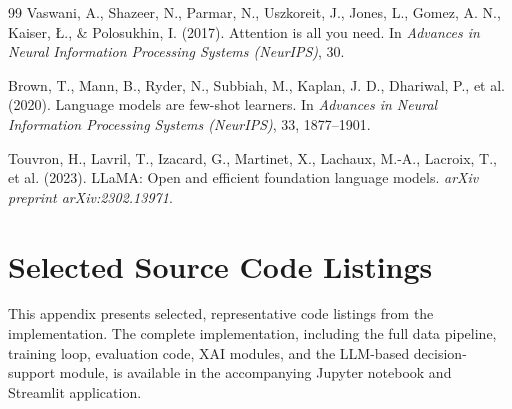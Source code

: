 \documentclass[12pt,a4paper,oneside]{report}
\begin{document}
\begin{thebibliography}{99}
Vaswani, A., Shazeer, N., Parmar, N., Uszkoreit, J., Jones, L., Gomez, A. N., Kaiser, {\L}., \& Polosukhin, I.
(2017). Attention is all you need. In \textit{Advances in Neural Information Processing Systems (NeurIPS)}, 30.

Brown, T., Mann, B., Ryder, N., Subbiah, M., Kaplan, J. D., Dhariwal, P., et al. (2020). Language models are
few-shot learners. In \textit{Advances in Neural Information Processing Systems (NeurIPS)}, 33, 1877--1901.

Touvron, H., Lavril, T., Izacard, G., Martinet, X., Lachaux, M.-A., Lacroix, T., et al. (2023). LLaMA: Open and
efficient foundation language models. \textit{arXiv preprint arXiv:2302.13971}.

\end{thebibliography}

\appendix
\chapter{Selected Source Code Listings}
\label{ap:code}

This appendix presents selected, representative code listings from the implementation. The complete
implementation, including the full data pipeline, training loop, evaluation code, XAI modules, and the LLM-based
decision-support module, is available in the accompanying Jupyter notebook and Streamlit application.
\end{document}

